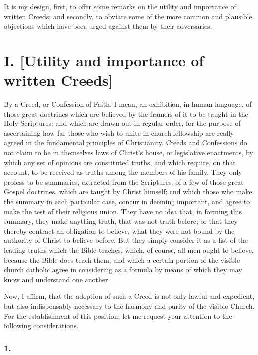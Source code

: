 \documentclass[
]{book}
\begin{document}
It is my design, first, to offer some remarks on the utility and importance of written Creeds; and secondly, to obviate some of the more common and plausible objections which have been urged against them by their adversaries.

\hypertarget{i.-utility-and-importance-of-written-creeds}{%
\section*{I. {[}Utility and importance of written Creeds{]}}\label{i.-utility-and-importance-of-written-creeds}}

By a Creed, or Confession of Faith, I mean, an exhibition, in human language, of those great doctrines which are believed by the framers of it to be taught in the Holy Scriptures; and which are drawn out in regular order, for the purpose of ascertaining how far those who wish to unite in church fellowship are really agreed in the fundamental principles of Christianity. Creeds and Confessions do not claim to be in themselves laws of Christ's house, or legislative enactments, by which any set of opinions are constituted truths, and which require, on that account, to be received as truths among the members of his family. They only profess to be summaries, extracted from the Scriptures, of a few of those great Gospel doctrines, which are taught by Christ himself; and which those who make the summary in each particular case, concur in deeming important, and agree to make the test of their religious union. They have no idea that, in forming this summary, they make anything truth, that was not truth before; or that they thereby contract an obligation to believe, what they were not bound by the authority of Christ to believe before. But they simply consider it as a list of the leading truths which the Bible teaches, which, of course, all men ought to believe, because the Bible does teach them; and which a certain portion of the visible church catholic agree in considering as a formula by means of which they may know and understand one another.

Now, I affirm, that the adoption of such a Creed is not only lawful and expedient, but also indispensably necessary to the harmony and purity of the visible Church. For the establishment of this position, let me request your attention to the following considerations.

\hypertarget{section}{%
\subsubsection*{1.}\label{section}}
\end{document}
